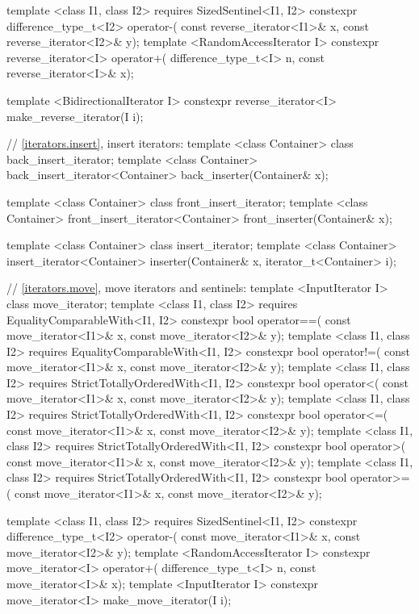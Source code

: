 \begin{codeblock}
{{{{  template <class I1, class I2>
      requires SizedSentinel<I1, I2>
    constexpr difference_type_t<I2> operator-(
      const reverse_iterator<I1>& x,
      const reverse_iterator<I2>& y);
  template <RandomAccessIterator I>
    constexpr reverse_iterator<I> operator+(
      difference_type_t<I> n,
      const reverse_iterator<I>& x);

  template <BidirectionalIterator I>
    constexpr reverse_iterator<I> make_reverse_iterator(I i);

  // \ref{iterators.insert}, insert iterators:
  template <class Container> class back_insert_iterator;
  template <class Container>
    back_insert_iterator<Container> back_inserter(Container& x);

  template <class Container> class front_insert_iterator;
  template <class Container>
    front_insert_iterator<Container> front_inserter(Container& x);

  template <class Container> class insert_iterator;
  template <class Container>
    insert_iterator<Container> inserter(Container& x, iterator_t<Container> i);

  // \ref{iterators.move}, move iterators and sentinels:
  template <InputIterator I> class move_iterator;
  template <class I1, class I2>
      requires EqualityComparableWith<I1, I2>
    constexpr bool operator==(
      const move_iterator<I1>& x, const move_iterator<I2>& y);
  template <class I1, class I2>
      requires EqualityComparableWith<I1, I2>
    constexpr bool operator!=(
      const move_iterator<I1>& x, const move_iterator<I2>& y);
  template <class I1, class I2>
      requires StrictTotallyOrderedWith<I1, I2>
    constexpr bool operator<(
      const move_iterator<I1>& x, const move_iterator<I2>& y);
  template <class I1, class I2>
      requires StrictTotallyOrderedWith<I1, I2>
    constexpr bool operator<=(
      const move_iterator<I1>& x, const move_iterator<I2>& y);
  template <class I1, class I2>
      requires StrictTotallyOrderedWith<I1, I2>
    constexpr bool operator>(
      const move_iterator<I1>& x, const move_iterator<I2>& y);
  template <class I1, class I2>
      requires StrictTotallyOrderedWith<I1, I2>
    constexpr bool operator>=(
      const move_iterator<I1>& x, const move_iterator<I2>& y);

  template <class I1, class I2>
      requires SizedSentinel<I1, I2>
    constexpr difference_type_t<I2> operator-(
      const move_iterator<I1>& x,
      const move_iterator<I2>& y);
  template <RandomAccessIterator I>
    constexpr move_iterator<I> operator+(
      difference_type_t<I> n,
      const move_iterator<I>& x);
  template <InputIterator I>
    constexpr move_iterator<I> make_move_iterator(I i);

}}}}
\end{codeblock}
